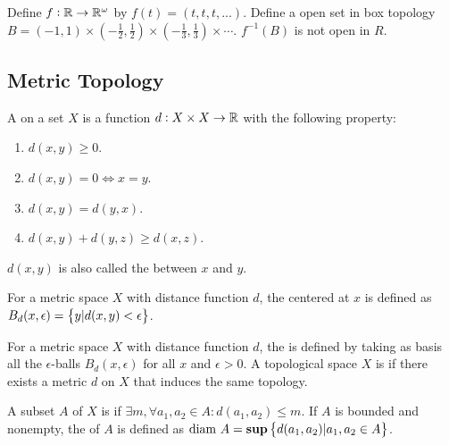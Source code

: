 \begin{example}
    Define $f: \mathbb{R} \rightarrow \mathbb{R}^{\omega}$ by $f(t) = (t,t,t, ...)$. Define a open set in box topology $B = (-1, 1) \times (- \frac{1}{2}, \frac{1}{2}) \times  (- \frac{1}{3}, \frac{1}{3}) \times \cdots$. $f^{-1}(B)$ is not open in $R$.
\end{example}

\subsection{Metric Topology}

\begin{definition}
    A  on a set $X$ is a function $d: X \times X \rightarrow \mathbb{R}$ with the following property:
    \begin{enumerate}
        \item $d(x,y) \geq 0$.
        \item $d(x,y) = 0 \Leftrightarrow x = y$.
        \item $d(x,y) = d(y,x)$.
        \item $d(x,y) + d(y,z) \geq d(x,z)$.
    \end{enumerate}
    $d(x,y)$ is also called the  between $x$ and $y$.
\end{definition}

\begin{definition}
    For a metric space $X$ with distance function $d$, the  centered at $x$ is defined as $B_d(x, \epsilon) = \set{y | d(x,y) < \epsilon}$.
\end{definition}

\begin{definition}
    For a metric space $X$ with distance function $d$, the  is defined by taking as basis all the $\epsilon$-balls $B_d(x,\epsilon)$ for all $x$ and $\epsilon > 0$. A topological space $X$ is  if there exists a metric $d$ on $X$ that induces the same topology.
\end{definition}

\begin{definition}
    A subset $A$ of $X$ is  if $\exists m, \forall a_1, a_2 \in A: d(a_1, a_2) \leq m$. If $A$ is bounded and nonempty, the  of $A$ is defined as $\text{diam } A = \mathbf{sup} \set{d(a_1, a_2)| a_1, a_2 \in A} $.
\end{definition}


